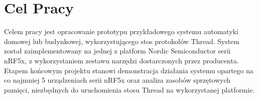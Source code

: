 \section*{Cel Pracy}
\label{cha:cel}

Celem pracy jest opracowanie prototypu przykładowego systemu automatyki domowej lub budynkowej, wykorzystującego stos protokołów Thread. System został zaimplementowany na jednej z platform Nordic Semiconductor serii nRF5x, z wykorzystaniem zestawu narzędzi dostarczonych przez producenta. Etapem końcowym projektu stanowi demonstracja działania systemu opartego na co najmniej 5 urządzeniach serii nRF5x oraz analiza zasobów sprzętowych pamięci, niezbędnych do uruchomienia stosu Thread na wykorzystanej platformie.
